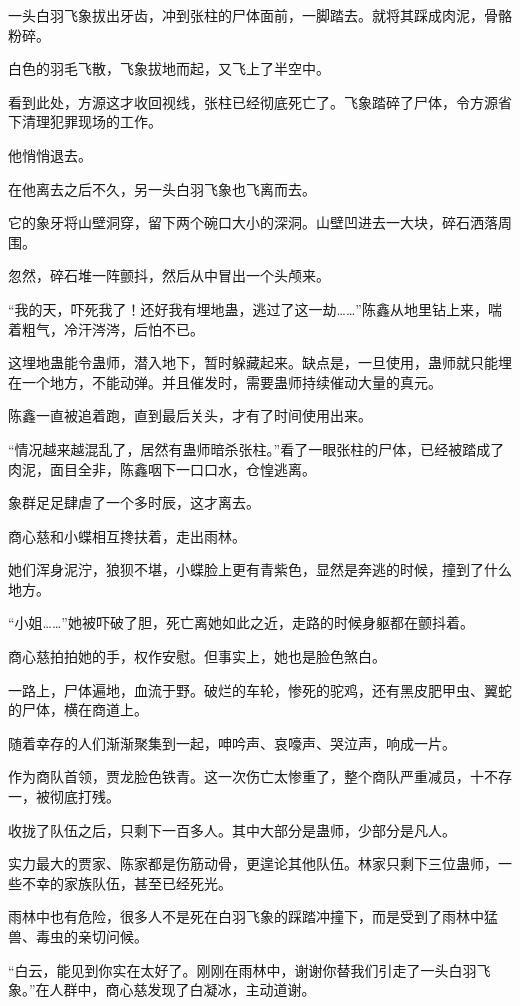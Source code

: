 \begin{this_body}
一头白羽飞象拔出牙齿，冲到张柱的尸体面前，一脚踏去。就将其踩成肉泥，骨骼粉碎。

白色的羽毛飞散，飞象拔地而起，又飞上了半空中。

看到此处，方源这才收回视线，张柱已经彻底死亡了。飞象踏碎了尸体，令方源省下清理犯罪现场的工作。

他悄悄退去。

在他离去之后不久，另一头白羽飞象也飞离而去。

它的象牙将山壁洞穿，留下两个碗口大小的深洞。山壁凹进去一大块，碎石洒落周围。

忽然，碎石堆一阵颤抖，然后从中冒出一个头颅来。

“我的天，吓死我了！还好我有埋地蛊，逃过了这一劫……”陈鑫从地里钻上来，喘着粗气，冷汗涔涔，后怕不已。

这埋地蛊能令蛊师，潜入地下，暂时躲藏起来。缺点是，一旦使用，蛊师就只能埋在一个地方，不能动弹。并且催发时，需要蛊师持续催动大量的真元。

陈鑫一直被追着跑，直到最后关头，才有了时间使用出来。

“情况越来越混乱了，居然有蛊师暗杀张柱。”看了一眼张柱的尸体，已经被踏成了肉泥，面目全非，陈鑫咽下一口口水，仓惶逃离。

象群足足肆虐了一个多时辰，这才离去。

商心慈和小蝶相互搀扶着，走出雨林。

她们浑身泥泞，狼狈不堪，小蝶脸上更有青紫色，显然是奔逃的时候，撞到了什么地方。

“小姐……”她被吓破了胆，死亡离她如此之近，走路的时候身躯都在颤抖着。

商心慈拍拍她的手，权作安慰。但事实上，她也是脸色煞白。

一路上，尸体遍地，血流于野。破烂的车轮，惨死的驼鸡，还有黑皮肥甲虫、翼蛇的尸体，横在商道上。

随着幸存的人们渐渐聚集到一起，呻吟声、哀嚎声、哭泣声，响成一片。

作为商队首领，贾龙脸色铁青。这一次伤亡太惨重了，整个商队严重减员，十不存一，被彻底打残。

收拢了队伍之后，只剩下一百多人。其中大部分是蛊师，少部分是凡人。

实力最大的贾家、陈家都是伤筋动骨，更遑论其他队伍。林家只剩下三位蛊师，一些不幸的家族队伍，甚至已经死光。

雨林中也有危险，很多人不是死在白羽飞象的踩踏冲撞下，而是受到了雨林中猛兽、毒虫的亲切问候。

“白云，能见到你实在太好了。刚刚在雨林中，谢谢你替我们引走了一头白羽飞象。”在人群中，商心慈发现了白凝冰，主动道谢。


\end{this_body}
